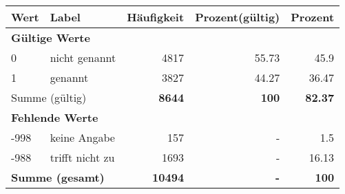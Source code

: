      \begin{longtable}{lXrrr}
     \toprule
     \textbf{Wert} & \textbf{Label} & \textbf{Häufigkeit} & \textbf{Prozent(gültig)} & \textbf{Prozent} \\
     \endhead
     \midrule
     \multicolumn{5}{l}{\textbf{Gültige Werte}}\\

     0 &
     \multicolumn{1}{X}{ nicht genannt   } &


       \num{4817} &
       \num[round-mode=places,round-precision=2]{55.73} &
         \num[round-mode=places,round-precision=2]{45.9} \\

     1 &
     \multicolumn{1}{X}{ genannt   } &


       \num{3827} &
       \num[round-mode=places,round-precision=2]{44.27} &
         \num[round-mode=places,round-precision=2]{36.47} \\
     \midrule
     \multicolumn{2}{l}{Summe (gültig)} &
       \textbf{\num{8644}} &
     \textbf{\num{100}} &
       \textbf{\num[round-mode=places,round-precision=2]{82.37}} \\
     \multicolumn{5}{l}{\textbf{Fehlende Werte}}\\
       -998 &
       keine Angabe &
         \num{157} &
        - &
         \num[round-mode=places,round-precision=2]{1.5} \\
       -988 &
       trifft nicht zu &
         \num{1693} &
        - &
         \num[round-mode=places,round-precision=2]{16.13} \\
     \midrule
     \multicolumn{2}{l}{\textbf{Summe (gesamt)}} &
          \textbf{\num{10494}} &
        \textbf{-} &
        \textbf{\num{100}} \\
     \bottomrule
     \end{longtable}
     
